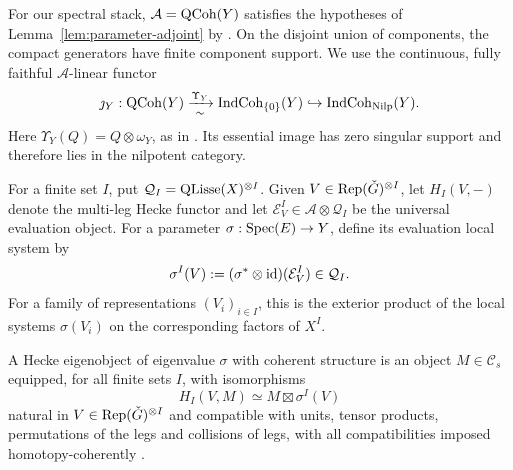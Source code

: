 For our spectral stack, \(\mathcal A=\operatorname{QCoh}(Y)\) satisfies the hypotheses
of Lemma~\ref{lem:parameter-adjoint} by
\cite[\S7.9 and Corollary~C.4.4]{AGKRRV}.
On the disjoint union of components, the compact generators have finite
component support.  We use the continuous, fully faithful \(\mathcal A\)-linear functor
\[
 \jmath_Y:\operatorname{QCoh}(Y)
 \xrightarrow[\sim]{\Upsilon_Y}\operatorname{IndCoh}_{\{0\}}(Y)
 \hookrightarrow\operatorname{IndCoh}_{\operatorname{Nilp}}(Y).
\]
Here \(\Upsilon_Y(Q)=Q\otimes\omega_Y\), as in
\cite[\S1.3.1, Equation~(1.2)]{GR}.
Its essential image has zero singular support and therefore lies in the
nilpotent category.

For a finite set \(I\), put \(\mathcal Q_I=\operatorname{QLisse}(X)^{\otimes I}\).
Given \(V\in\operatorname{Rep}(\check G)^{\otimes I}\), let \(H_I(V,-)\) denote the
multi-leg Hecke functor and let
\(\mathcal E_V^I\in\mathcal A\otimes\mathcal Q_I\)
be the universal evaluation object.  For a parameter
\(\sigma:\operatorname{Spec}(E)\to Y\), define its evaluation local system by
\[
 \sigma^I(V):=(\sigma^*\otimes\operatorname{id})(\mathcal E_V^I)
 \in\mathcal Q_I.
\]
For a family of representations \((V_i)_{i\in I}\), this is the exterior
product of the local systems \(\sigma(V_i)\) on the corresponding factors
of \(X^I\).

\begin{definition}\label{def:eigenstructure}
A Hecke eigenobject of eigenvalue \(\sigma\) with coherent structure is an
object \(M\in\mathcal C_s\) equipped, for all finite sets \(I\), with
isomorphisms
\[
 H_I(V,M)\simeq M\boxtimes\sigma^I(V)
\]
natural in \(V\in\operatorname{Rep}(\check G)^{\otimes I}\) and compatible with units,
tensor products, permutations of the legs and collisions of legs, with
all compatibilities imposed homotopy-coherently
\cite[\S15.2]{AGKRRV}.
\end{definition}

